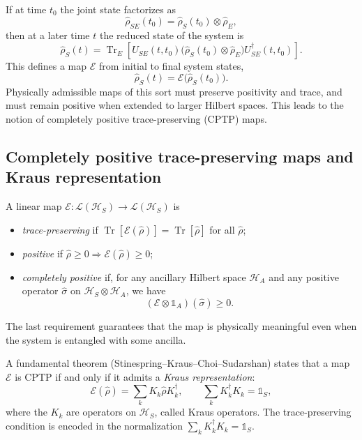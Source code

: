 If at time $t_0$ the joint state factorizes as
\begin{equation}
	\hat{\rho}_{SE}(t_0) = \hat{\rho}_S(t_0) \otimes \hat{\rho}_E,
\end{equation}
then at a later time $t$ the reduced state of the system is
\begin{equation}
	\hat{\rho}_S(t) 
	= 
	\operatorname{Tr}_E\left[
	U_{SE}(t,t_0) \bigl( \hat{\rho}_S(t_0) \otimes \hat{\rho}_E \bigr) U_{SE}^\dagger(t,t_0)
	\right].
\end{equation}
This defines a map $\mathcal{E}$ from initial to final system states,
\begin{equation}
	\hat{\rho}_S(t) = \mathcal{E}\bigl(\hat{\rho}_S(t_0)\bigr).
\end{equation}
Physically admissible maps of this sort must preserve positivity and trace, and must remain positive when extended to larger Hilbert spaces. 
This leads to the notion of completely positive trace-preserving (CPTP) maps.

\subsection{Completely positive trace-preserving maps and Kraus representation}

A linear map $\mathcal{E} : \mathcal{L}(\mathcal{H}_S) \to \mathcal{L}(\mathcal{H}_S)$ is
\begin{itemize}
	\item \emph{trace-preserving} if $\operatorname{Tr}[\mathcal{E}(\hat{\rho})] = \operatorname{Tr}[\hat{\rho}]$ for all $\hat{\rho}$;
	\item \emph{positive} if $\hat{\rho} \geq 0 \Rightarrow \mathcal{E}(\hat{\rho}) \geq 0$;
	\item \emph{completely positive} if, for any ancillary Hilbert space $\mathcal{H}_A$ and any positive operator $\hat{\sigma}$ on $\mathcal{H}_S \otimes \mathcal{H}_A$, we have
	\begin{equation}
		(\mathcal{E} \otimes \mathbb{1}_A)(\hat{\sigma}) \geq 0.
	\end{equation}
\end{itemize}
The last requirement guarantees that the map is physically meaningful even when the system is entangled with some ancilla.

A fundamental theorem (Stinespring--Kraus--Choi--Sudarshan) states that a map $\mathcal{E}$ is CPTP if and only if it admits a \emph{Kraus representation}:
\begin{equation}
	\mathcal{E}(\hat{\rho}) = \sum_k K_k \hat{\rho} K_k^\dagger,
	\qquad
	\sum_k K_k^\dagger K_k = \mathbb{1}_S,
\end{equation}
where the $K_k$ are operators on $\mathcal{H}_S$, called Kraus operators. 
The trace-preserving condition is encoded in the normalization $\sum_k K_k^\dagger K_k = \mathbb{1}_S$.


